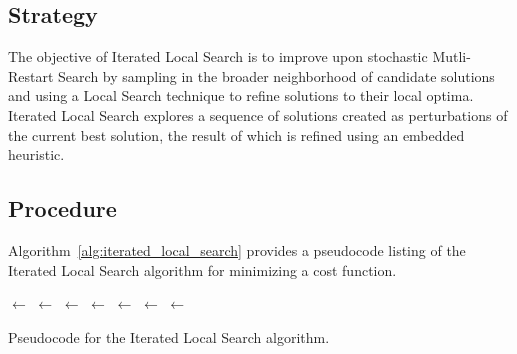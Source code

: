 \subsection{Strategy}
The objective of Iterated Local Search is to improve upon stochastic Mutli-Restart Search by sampling in the broader neighborhood of candidate solutions and using a Local Search technique to refine solutions to their local optima.
Iterated Local Search explores a sequence of solutions created as perturbations of the current best solution, the result of which is refined using an embedded heuristic.

\subsection{Procedure}
Algorithm~\ref{alg:iterated_local_search} provides a pseudocode listing of the Iterated Local Search algorithm for minimizing a cost function.

\begin{algorithm}[htp]
	\SetLine
	\KwIn{}
	\KwOut{\Best}
	\Best $\leftarrow$ \ConstructInitialSolution{}\;
	\Best $\leftarrow$ \LocalSearch{}\;
	\SearchHistory $\leftarrow$ \Best\;
	\While{$\neg$ \StopCondition{}} {
		\Candidate $\leftarrow$ \Perturbation{\Best, \SearchHistory}\;
		\Candidate $\leftarrow$ \LocalSearch{\Candidate}\;
		\SearchHistory $\leftarrow$ \Candidate\;
		\If{\AcceptanceCriterion{\Best, \Candidate, \SearchHistory}} {
			\Best $\leftarrow$ \Candidate\;
		}
	}
	\Return{\Best}\;
	\caption{Pseudocode for the Iterated Local Search algorithm.}
	\label{alg:iterated_local_search}
\end{algorithm}

